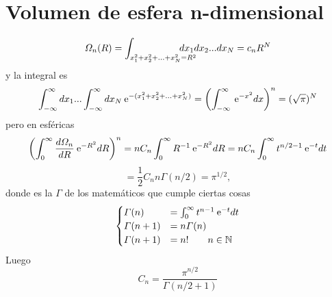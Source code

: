\documentclass[10pt,oneside]{CBFT_book}
\begin{document}
 
 
\appendix

\chapter{Volumen de esfera n-dimensional}\label{App.volumen_esfera}

\[
	\Omega_n (R) = \int_{x_1^2 + x_2^2 + ... + x_N^2 = R^2 } \kern-2em dx_1 dx_2 ... dx_N = c_n R^N
\]
y la integral es
\[
	\int_{-\infty}^{\infty} dx_1 ... \int_{-\infty}^{\infty} dx_N \:\mathrm{e}^{-(x_1^2 + x_2^2 + ... + x_N^2)} =
	\left( \int_{-\infty}^{\infty} \:\mathrm{e}^{-x^2} dx \right)^n = (\sqrt{\pi})^N
\]
pero en esféricas
\[
	\left( \int_{0}^{\infty} \frac{d^{\hspace{-0.05em}} {\Omega_n}}{d {R}^{\hspace{-0.05em}}} \:\mathrm{e}^{-R^2} dR \right)^n =
	n C_n \int_{0}^{\infty} R^{-1} \:\mathrm{e}^{-R^2} dR = 
	n C_n \int_{0}^{\infty} t^{n/2-1} \:\mathrm{e}^{-t} dt 
\]
\[
	= \frac{1}{2} C_n n \Gamma(n/2) = \pi^{1/2},
\]
donde es la $\Gamma$ de los matemáticos que cumple ciertas cosas
\[
	\begin{cases}
		\Gamma(n) &= \int_{0}^{\infty} t^{n-1} \:\mathrm{e}^{-t} dt\\
		\Gamma(n+1) &= n \Gamma(n) \\
		\Gamma(n+1) &= n! \qquad n \in \mathbb{N} 
	\end{cases}
\]
Luego
\[
	C_n = \frac{ \pi^{n/2} }{ \Gamma(n/2 + 1) }
\]

%  
\end{document}
